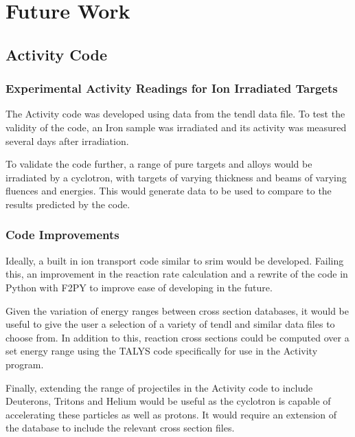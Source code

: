 \chapter{Future Work}
\label{chapter:futurework}

\begin{changemargin}{1.0cm}{1.0cm} 
\end{changemargin}


\section{Activity Code}

\subsection{Experimental Activity Readings for Ion Irradiated Targets}

The Activity code was developed using data from the \acrshort{tendl} data file.  To test the validity of the code, an Iron sample was irradiated and its activity was measured several days after irradiation.

To validate the code further, a range of pure targets and alloys would be irradiated by a cyclotron, with targets of varying thickness and beams of varying fluences and energies.  This would generate data to be used to compare to the results predicted by the code.  


\subsection{Code Improvements}

Ideally, a built in ion transport code similar to \acrshort{srim} would be developed.  Failing this, an improvement in the reaction rate calculation and a rewrite of the code in Python with F2PY to improve ease of developing in the future.

Given the variation of energy ranges between cross section databases, it would be useful to give the user a selection of a variety of \acrshort{tendl} and similar data files to choose from.  In addition to this, reaction cross sections could be computed over a set energy range using the TALYS code specifically for use in the Activity program.

Finally, extending the range of projectiles in the Activity code to include Deuterons, Tritons and Helium would be useful as the cyclotron is capable of accelerating these particles as well as protons.  It would require an extension of the database to include the relevant cross section files.


